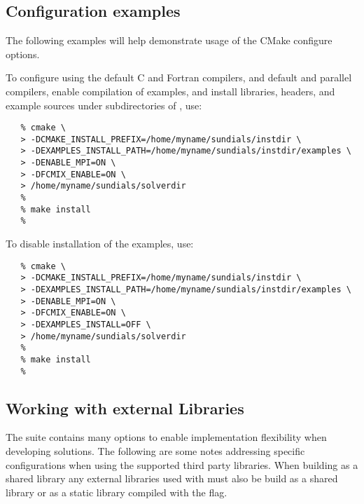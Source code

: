 



\subsection{Configuration examples}

The following examples will help demonstrate usage of the CMake configure options.

\noindent To configure {\sundials} using the default C and Fortran compilers,
and default  and  parallel compilers,
enable compilation of examples, and install libraries, headers, and
example sources under subdirectories of
, use:

\begin{verbatim}
   % cmake \
   > -DCMAKE_INSTALL_PREFIX=/home/myname/sundials/instdir \
   > -DEXAMPLES_INSTALL_PATH=/home/myname/sundials/instdir/examples \
   > -DENABLE_MPI=ON \
   > -DFCMIX_ENABLE=ON \
   > /home/myname/sundials/solverdir
   %
   % make install
   %
\end{verbatim}

\noindent To disable installation of the examples, use:
\begin{verbatim}
   % cmake \
   > -DCMAKE_INSTALL_PREFIX=/home/myname/sundials/instdir \
   > -DEXAMPLES_INSTALL_PATH=/home/myname/sundials/instdir/examples \
   > -DENABLE_MPI=ON \
   > -DFCMIX_ENABLE=ON \
   > -DEXAMPLES_INSTALL=OFF \
   > /home/myname/sundials/solverdir
   %
   % make install
   %
\end{verbatim}

\subsection{Working with external Libraries} \label{ss:externallibs}

The {\sundials} suite contains many options to enable implementation flexibility
when developing solutions. The following are some notes addressing specific configurations
when using the supported third party libraries.
When building {\sundials} as a shared library any external libraries
used with {\sundials} must also be build as a shared library or as a
static library compiled with the  flag.{\warn}

